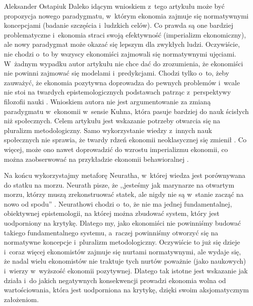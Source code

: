 \begin{artplenv}{Aleksander Ostapiuk}
Daleko idącym wnioskiem z~tego artykułu może być propozycja nowego paradygmatu, w~którym ekonomia zajmuje się
normatywnymi koncepcjami (badanie szczęścia i~ludzkich celów). Co prawda są one bardziej
problematyczne i~ekonomia straci swoją efektywność (imperializm ekonomiczny), ale nowy paradygmat może okazać
się lepszym dla zwykłych
ludzi. Oczywiście, nie chodzi o~to by wszyscy ekonomiści zajmowali się normatywnymi ujęciami. W~żadnym wypadku autor
artykułu nie chce dać do zrozumienia, że ekonomiści nie powinni zajmować się modelami i~predykcjami. Chodzi tylko o~to,
żeby zauważyć, że ekonomia pozytywna doprowadza do pewnych problemów i~wcale nie stoi na twardych epistemologicznych
podstawach patrząc z~perspektywy filozofii nauki
\parencite{kuhn_structure_1962,feyerabend_against_1975,lakatos_methodology_1980,caldwell_beyond_1982,mccloskey_rhetoric_1998,hands_reflection_2001}.
Wnioskiem autora nie jest argumentowanie za zmianą
paradygmatu w~ekonomii w~sensie Kuhna, która pasuje bardziej do nauk ścisłych niż społecznych.
Celem artykułu jest wskazanie potrzeby
otwarcia się na pluralizm metodologiczny. Samo wykorzystanie wiedzy z~innych nauk społecznych nie sprawia, że twardy
rdzeń ekonomii neoklasycznej się zmienił
\parencite[zob.][]{dow_foundations_2012}.
Co więcej, może ono nawet
doprowadzić do wzrostu imperializmu ekonomii, co można zaobserwować na przykładzie ekonomii behawioralnej
\parencite{berg_as-if_2010}.

Na końcu wykorzystajmy metaforę Neuratha, w~której wiedza jest porównywana do statku na morzu. Neurath pisze, że
,,jesteśmy jak marynarze na otwartym morzu, którzy muszą zrekonstruować statek, ale nigdy nie są w~stanie zacząć na nowo
od spodu''
\parencite[s.~199]{neurath_anti-spengler_1973}.
Neurathowi chodzi o~to, że nie ma jednej fundamentalnej,
obiektywnej epistemologii, na której można zbudować system, który jest uodporniony na krytykę. Dlatego my, jako
ekonomiści nie powinniśmy budować takiego fundamentalnego systemu, a~raczej powinniśmy otworzyć się na normatywne
koncepcje i~pluralizm metodologiczny. Oczywiście to już się dzieje i~coraz więcej ekonomistów zajmuje się nurtami
normatywnymi, ale wydaje się, że nadal wielu ekonomistów nie traktuje tych nurtów poważnie
(jako naukowych) i~wierzy w~wyższość ekonomii pozytywnej.
Dlatego tak istotne jest wskazanie jak działa i~do jakich negatywnych konsekwencji
prowadzi ekonomia wolna od wartościowania, która jest uodporniona na krytykę, dzięki swoim aksjomatycznym założeniom. 

\end{artplenv}
